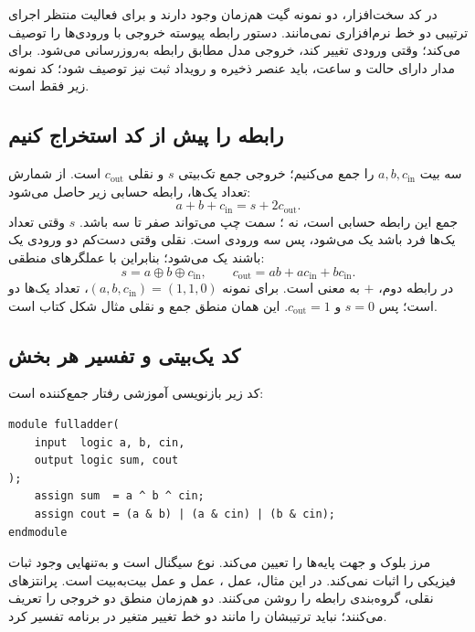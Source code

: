 در کد سخت‌افزار، دو نمونه گیت هم‌زمان وجود دارند و برای فعالیت منتظر اجرای
ترتیبی دو خط نرم‌افزاری نمی‌مانند. دستور  رابطه پیوسته خروجی
با ورودی‌ها را توصیف می‌کند؛ وقتی ورودی تغییر کند، خروجی مدل مطابق رابطه به‌روزرسانی می‌شود.
برای مدار دارای حالت و ساعت، باید عنصر ذخیره و رویداد ثبت نیز توصیف شود؛
کد نمونه زیر فقط  است.

\subsection{رابطه  را پیش از کد استخراج کنیم}
سه بیت \(a,b,c_{\mathrm{in}}\) را جمع می‌کنیم؛ خروجی جمع تک‌بیتی \(s\)
و نقلی \(c_{\mathrm{out}}\) است.
از شمارش تعداد یک‌ها، رابطه حسابی زیر حاصل می‌شود:
\begin{equation}\label{eq:hdl-fulladder-number}
a+b+c_{\mathrm{in}}=s+2c_{\mathrm{out}}.
\end{equation}
جمع این رابطه حسابی است، نه ؛ سمت چپ می‌تواند صفر تا سه باشد.
\(s\) وقتی تعداد یک‌ها فرد باشد یک می‌شود، پس  سه ورودی است.
نقلی وقتی دست‌کم دو ورودی یک باشند یک می‌شود؛ بنابراین با عملگرهای منطقی:
\begin{equation}\label{eq:hdl-fulladder}
s=a\oplus b\oplus c_{\mathrm{in}},\qquad
c_{\mathrm{out}}=ab+ac_{\mathrm{in}}+bc_{\mathrm{in}}.
\end{equation}
در رابطه دوم، \(+\) به معنی  است.
برای نمونه \((a,b,c_{\mathrm{in}})=(1,1,0)\)، تعداد یک‌ها دو است؛
پس \(s=0\) و \(c_{\mathrm{out}}=1\).
این همان منطق جمع و نقلی مثال شکل  کتاب است.

\subsection{کد یک‌بیتی و تفسیر هر بخش}
کد زیر بازنویسی آموزشی رفتار جمع‌کننده است:
\begin{latin}
\small
\begin{verbatim}
module fulladder(
    input  logic a, b, cin,
    output logic sum, cout
);
    assign sum  = a ^ b ^ cin;
    assign cout = (a & b) | (a & cin) | (b & cin);
endmodule
\end{verbatim}
\end{latin}
 مرز بلوک و  جهت پایه‌ها را تعیین می‌کند.
 نوع سیگنال است و به‌تنهایی وجود ثبات فیزیکی را اثبات نمی‌کند.
در این مثال، \code{\textasciicircum} عمل ، \code{\&} عمل  و
\code{|} عمل  بیت‌به‌بیت است. پرانتزهای نقلی، گروه‌بندی رابطه را روشن می‌کنند.
دو  هم‌زمان منطق دو خروجی را تعریف می‌کنند؛
نباید ترتیبشان را مانند دو خط تغییر متغیر در برنامه  تفسیر کرد.


